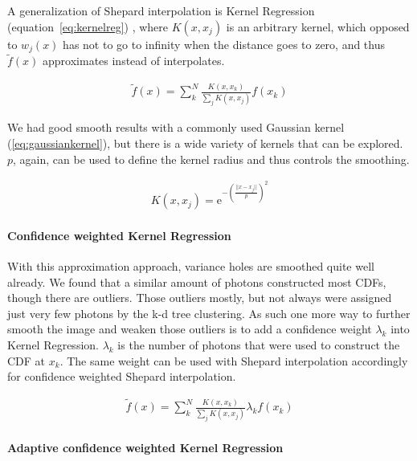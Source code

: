 A generalization of Shepard interpolation is Kernel Regression (equation~\ref{eq:kernelreg}) \parencite{DBLP:conf/siggraph/AnjyoLP14}, where $K(x, x_j)$ is an arbitrary kernel, which opposed to $w_j(x)$ has not to go to infinity when the distance goes to zero, and thus $\widetilde{f}(x)$ approximates instead of interpolates. 

\begin{align}\label{eq:kernelreg}
\widetilde{f}(x) = \sum_{k}^{N}\frac{K(x,x_k)}{\sum\nolimits_{j}K(x, x_j)}f(x_k)
\end{align}

We had good smooth results with a commonly used Gaussian kernel (\ref{eq:gaussiankernel}), but there is a wide variety of kernels that can be explored. $p$, again, can be used to define the kernel radius and thus controls the smoothing.

\begin{align}\label{eq:gaussiankernel}
K(x, x_j) = \mathrm{e}^{-\left(\frac{||x-x_j||}{p}\right)^2}
\end{align}

\paragraph{Confidence weighted Kernel Regression}
\label{ch:ckernelreg}
With this approximation approach, variance holes are smoothed quite well already. We found that a similar amount of photons constructed most CDFs, though there are outliers. Those outliers mostly, but not always were assigned just very few photons by the k-d tree clustering. As such one more way to further smooth the image and weaken those outliers is to add a confidence weight $\lambda_k$ into Kernel Regression. $\lambda_k$ is the number of photons that were used to construct the CDF at $x_k$. The same weight can be used with Shepard interpolation accordingly for confidence weighted Shepard interpolation.

\begin{align}\label{eq:ckernelreg}
\widetilde{f}(x) = \sum_{k}^{N}\frac{K(x,x_k)}{\sum\nolimits_{j}K(x, x_j)}\lambda_kf(x_k)
\end{align}

\paragraph{Adaptive confidence weighted Kernel Regression}
\label{ch:adckernelreg}

